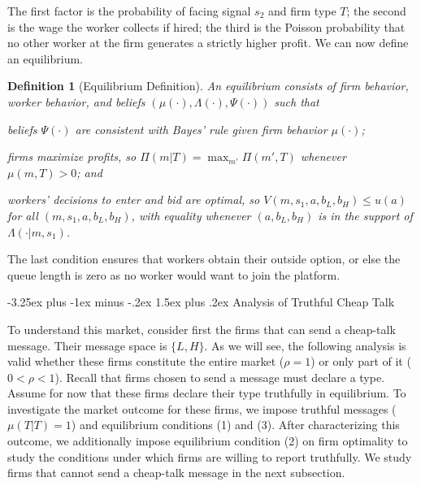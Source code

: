 \documentclass[12pt]{article}
\makeatletter
\renewcommand{\subsection}{%
  \@startsection{subsection}{2}{\z@}%
  {-3.25ex plus -1ex minus -.2ex}%
  {1.5ex plus .2ex}%
  {\normalfont\large\bfseries}%
}
\newtheorem*{definition*}{Definition}
\makeatother
\begin{document}
The first factor is the probability of facing signal $s_{2}$ and firm type $T$;
the second is the wage the worker collects if hired; the third is the Poisson
probability that no other worker at the firm generates a strictly higher profit.
We can now define an equilibrium.

\begin{definition*}[Equilibrium Definition]
An equilibrium consists of firm behavior, worker behavior, and beliefs
$(\mu(\cdot),\Lambda(\cdot),\Psi(\cdot))$ such that
\begin{enumerate}[label={[\arabic*]}]
\item beliefs $\Psi(\cdot)$ are consistent with Bayes' rule given firm
behavior $\mu(\cdot)$;
\item firms maximize profits, so $\Pi(m|T)=\max_{m'}\Pi(m',T)$ whenever
$\mu(m,T)>0$; and
\item workers' decisions to enter and bid are optimal, so
$V(m,s_{1},a,b_{L},b_{H})\leq u(a)$ for all $(m,s_{1},a,b_{L},b_{H})$, with
equality whenever $(a,b_{L},b_{H})$ is in the support of
$\Lambda(\cdot|m,s_{1})$.
\end{enumerate}
\end{definition*}

The last condition ensures that workers obtain their outside option, or else the queue length is zero as no worker would want to join the platform. 




\subsection{Analysis of Truthful Cheap Talk}\label{sec:truthful}

To understand this market, consider first the firms that can send a cheap-talk message. Their message space is $\{L,H\}$. As we will see, the following analysis is valid whether these firms constitute the entire market ($\rho=1$) or only part of it ($0<\rho<1$). Recall that firms chosen to send a message must declare a type. Assume for now that these firms declare their type truthfully in equilibrium. To investigate the market outcome for these firms, we impose truthful messages ($\mu(T|T)=1$) and equilibrium conditions (1) and (3). After characterizing this outcome, we additionally impose equilibrium condition (2) on firm optimality to study the conditions under which firms are willing to report truthfully. We study firms that cannot send a cheap-talk message in the next subsection.
\end{document}
